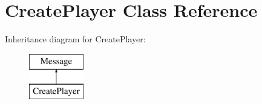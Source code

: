 \hypertarget{class_create_player}{\section{Create\-Player Class Reference}
\label{class_create_player}
}
Inheritance diagram for Create\-Player\-:\begin{figure}[H]
\begin{center}
\leavevmode
\includegraphics[height=2.000000cm]{class_create_player}
\end{center}
\end{figure}
